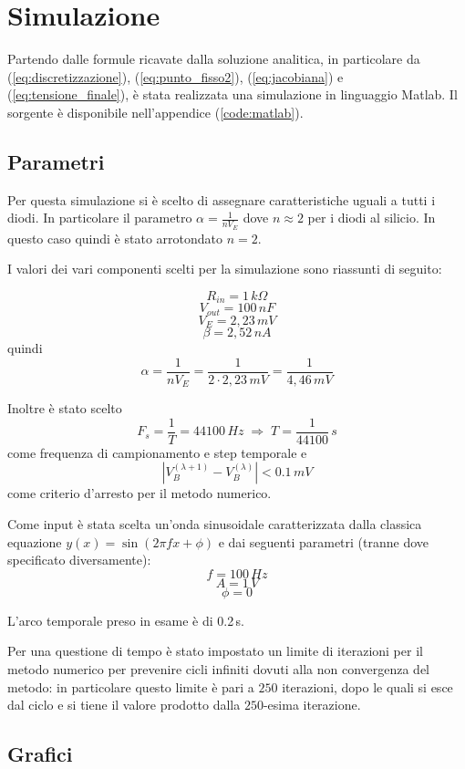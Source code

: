 \chapter{Simulazione}
	Partendo dalle formule ricavate dalla soluzione analitica, in particolare da (\ref{eq:discretizzazione}), (\ref{eq:punto_fisso2}), (\ref{eq:jacobiana}) e (\ref{eq:tensione_finale}), è stata realizzata una simulazione in linguaggio Matlab. Il sorgente è disponibile nell'appendice (\ref{code:matlab}).
	
	\section{Parametri}
		Per questa simulazione si è scelto di assegnare caratteristiche uguali a tutti i diodi. In particolare il parametro $\alpha = \frac{1}{nV_{E}}$ dove $n \approx 2$ per i diodi al silicio. In questo caso quindi è stato arrotondato $n = 2$.
	
		I valori dei vari componenti scelti per la simulazione sono riassunti di seguito:
	
		\[
			R_{in} = 1\,k\Omega
		\]
		\[
			V_{out} = 100\,nF
		\]
		\[
			V_{E} = 2,23\,mV
		\]
		\[
			\beta = 2,52\,nA
		\]
		quindi
		\[
			\alpha = \frac{1}{nV_{E}} = \frac{1}{2 \cdot 2,23\,mV} = \frac{1}{4,46\,mV}
		\]
	
		Inoltre è stato scelto
		\[
			F_{s} = \frac{1}{T} = 44100\,Hz \; \Rightarrow \; T = \frac{1}{44100}\,s
		\]
		come frequenza di campionamento e step temporale e
		\[
			|V_{B}^{(\lambda+1)} - V_{B}^{(\lambda)}| < 0.1\,mV
		\]
		come criterio d'arresto per il metodo numerico.
	
		Come input è stata scelta un'onda sinusoidale caratterizzata dalla classica equazione $y(x) = \sin (2 \pi f x + \phi)$ e dai seguenti parametri (tranne dove specificato diversamente):
		\[
			f = 100\,Hz
		\]
		\[
			A = 1\,V
		\]
		\[
			\phi = 0
		\]
		
		\vspace{10px}
		L'arco temporale preso in esame è di 0.2\,s.
		
		Per una questione di tempo è stato impostato un limite di iterazioni per il metodo numerico per prevenire cicli infiniti dovuti alla non convergenza del metodo: in particolare questo limite è pari a $250$ iterazioni, dopo le quali si esce dal ciclo e si tiene il valore prodotto dalla $250$-esima iterazione.
	\pagebreak
	
	\section{Grafici}
